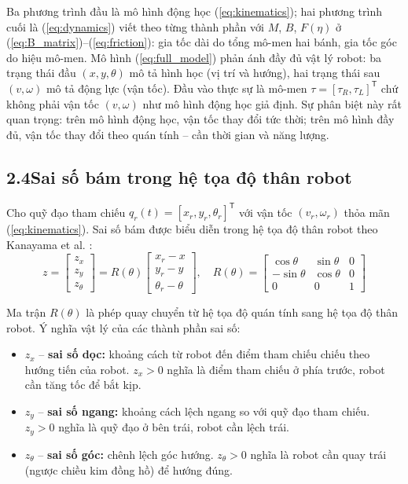 \documentclass[12pt,a4paper]{article}
\newcommand{\T}{\mathsf{T}}
\begin{document}
Ba phương trình đầu là mô hình động học (\ref{eq:kinematics}); hai phương trình cuối là (\ref{eq:dynamics}) viết theo từng thành phần với $M$, $B$, $F(\eta)$ ở (\ref{eq:B_matrix})--(\ref{eq:friction}): gia tốc dài do tổng mô-men hai bánh, gia tốc góc do hiệu mô-men. Mô hình (\ref{eq:full_model}) phản ánh đầy đủ vật lý robot: ba trạng thái đầu $(x, y, \theta)$ mô tả hình học (vị trí và hướng), hai trạng thái sau $(v, \omega)$ mô tả động lực (vận tốc). Đầu vào thực sự là mô-men $\tau = [\tau_R, \tau_L]^\T$ chứ không phải vận tốc $(v, \omega)$ như mô hình động học giả định. Sự phân biệt này rất quan trọng: trên mô hình động học, vận tốc thay đổi tức thời; trên mô hình đầy đủ, vận tốc thay đổi theo quán tính -- cần thời gian và năng lượng.

\subsection*{2.4\quad Sai số bám trong hệ tọa độ thân robot}

Cho quỹ đạo tham chiếu $q_r(t) = [x_r, y_r, \theta_r]^\T$ với vận tốc $(v_r, \omega_r)$ thỏa mãn (\ref{eq:kinematics}). Sai số bám được biểu diễn trong hệ tọa độ thân robot theo Kanayama et al. \cite{Kanayama1990}:
\begin{equation}\label{eq:error_def}
    z = \begin{bmatrix} z_x \\ z_y \\ z_\theta \end{bmatrix}
    = R(\theta) \begin{bmatrix} x_r - x \\ y_r - y \\ \theta_r - \theta \end{bmatrix}, \quad
    R(\theta) = \begin{bmatrix} \cos\theta & \sin\theta & 0 \\ -\sin\theta & \cos\theta & 0 \\ 0 & 0 & 1 \end{bmatrix}
\end{equation}

Ma trận $R(\theta)$ là phép quay chuyển từ hệ tọa độ quán tính sang hệ tọa độ thân robot. Ý nghĩa vật lý của các thành phần sai số:

\begin{itemize}
    \item $z_x$ -- \textbf{sai số dọc:} khoảng cách từ robot đến điểm tham chiếu chiếu theo hướng tiến của robot. $z_x > 0$ nghĩa là điểm tham chiếu ở phía trước, robot cần tăng tốc để bắt kịp.

    \item $z_y$ -- \textbf{sai số ngang:} khoảng cách lệch ngang so với quỹ đạo tham chiếu. $z_y > 0$ nghĩa là quỹ đạo ở bên trái, robot cần lệch trái.

    \item $z_\theta$ -- \textbf{sai số góc:} chênh lệch góc hướng. $z_\theta > 0$ nghĩa là robot cần quay trái (ngược chiều kim đồng hồ) để hướng đúng.
\end{itemize}
\end{document}
